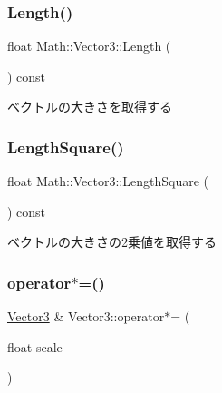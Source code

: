 \subsubsection{\texorpdfstring{Length()}{Length()}}
{\footnotesize\ttfamily float Math\+::\+Vector3\+::\+Length (\begin{DoxyParamCaption}{ }\end{DoxyParamCaption}) const}



ベクトルの大きさを取得する 

\mbox{\label{struct_math_1_1_vector3_a387697120da28a70e122f4d51dc6552c}} 
\subsubsection{\texorpdfstring{Length\+Square()}{LengthSquare()}}
{\footnotesize\ttfamily float Math\+::\+Vector3\+::\+Length\+Square (\begin{DoxyParamCaption}{ }\end{DoxyParamCaption}) const}



ベクトルの大きさの2乗値を取得する 

\mbox{\label{struct_math_1_1_vector3_a39ef536f18b367782130106cb6fe9195}} 
\subsubsection{\texorpdfstring{operator$\ast$=()}{operator*=()}}
{\footnotesize\ttfamily \mbox{\hyperlink{struct_math_1_1_vector3}{Vector3}} \& Vector3\+::operator$\ast$= (\begin{DoxyParamCaption}\item[{float}]{scale }\end{DoxyParamCaption})}

\mbox{\label{struct_math_1_1_vector3_ae593c862c998667ab02c426e13477daa}} 
